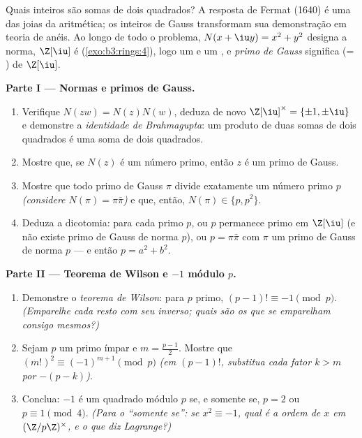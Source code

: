 \begin{problem}\label{pb:b3:rings:1}
Quais inteiros são somas de dois quadrados? A resposta de Fermat (1640)
é uma das joias da aritmética; os inteiros de Gauss transformam sua
demonstração em teoria de anéis. Ao longo de todo o problema, $N(x + \iu y) = x^2 + y^2$
designa a norma, $\Z[\iu]$ é  (\cref{exo:b3:rings:4}), logo um  e um
, e \emph{primo de Gauss} significa  (= )
de $\Z[\iu]$.

\medskip
\noindent\textbf{Parte I --- Normas e primos de Gauss.}
\begin{enumerate}
  \item Verifique $N(zw) = N(z)N(w)$, deduza de novo $\Z[\iu]^\times =
        \{\pm1, \pm\iu\}$ e demonstre a
        \emph{identidade de Brahmagupta}: um produto de duas somas de
        dois quadrados é uma soma de dois quadrados.
  \item Mostre que, se $N(z)$ é um número primo, então $z$ é um
        primo de Gauss.
  \item Mostre que todo primo de Gauss $\pi$ divide exatamente um
        número primo $p$ \emph{(considere $N(\pi) = \pi\bar\pi$)} e que, então,
        $N(\pi) \in \{p, p^2\}$.
  \item Deduza a dicotomia: para cada primo $p$, ou $p$
        permanece primo em $\Z[\iu]$ (e não existe primo de Gauss de norma
        $p$), ou $p = \pi\bar\pi$ com $\pi$ um primo de Gauss de norma
        $p$ --- e então $p = a^2 + b^2$.
\end{enumerate}

\medskip
\noindent\textbf{Parte II --- Teorema de Wilson e $-1$ módulo
$p$.}
\begin{enumerate}[resume]
  \item Demonstre o \emph{teorema de Wilson}: para $p$ primo,
        $(p-1)!
        \equiv -1 \pmod p$. \emph{(Emparelhe cada resto com seu inverso; quais são
        os que se emparelham consigo mesmos?)}
  \item Sejam $p$ um primo ímpar e $m = \frac{p-1}2$. Mostre que $(m!)^2 \equiv (-1)^{m+1} \pmod p$
        \emph{(em $(p-1)!$, substitua cada fator $k > m$ por
        $-(p - k)$)}.
  \item Conclua: $-1$ é um quadrado módulo $p$ se, e somente se,
        $p = 2$ ou $p
        \equiv 1 \pmod 4$. \emph{(Para o ``somente se'': se $x^2
        \equiv -1$,
        qual é a ordem de $x$ em $(\Z/p\Z)^\times$, e o que diz Lagrange?)}
\end{enumerate}


\end{problem}
